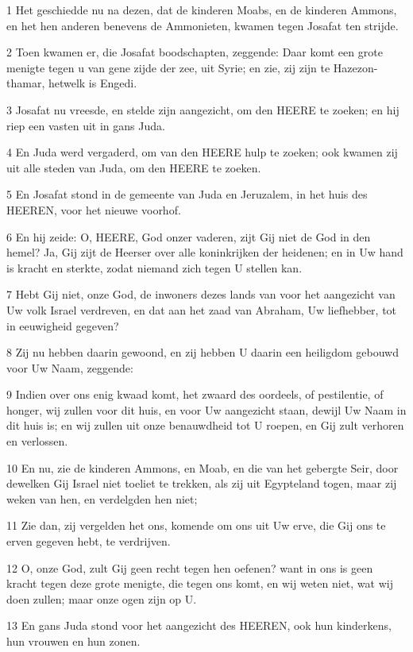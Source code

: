 \par 1 Het geschiedde nu na dezen, dat de kinderen Moabs, en de kinderen Ammons, en het hen anderen benevens de Ammonieten, kwamen tegen Josafat ten strijde.
\par 2 Toen kwamen er, die Josafat boodschapten, zeggende: Daar komt een grote menigte tegen u van gene zijde der zee, uit Syrie; en zie, zij zijn te Hazezon-thamar, hetwelk is Engedi.
\par 3 Josafat nu vreesde, en stelde zijn aangezicht, om den HEERE te zoeken; en hij riep een vasten uit in gans Juda.
\par 4 En Juda werd vergaderd, om van den HEERE hulp te zoeken; ook kwamen zij uit alle steden van Juda, om den HEERE te zoeken.
\par 5 En Josafat stond in de gemeente van Juda en Jeruzalem, in het huis des HEEREN, voor het nieuwe voorhof.
\par 6 En hij zeide: O, HEERE, God onzer vaderen, zijt Gij niet de God in den hemel? Ja, Gij zijt de Heerser over alle koninkrijken der heidenen; en in Uw hand is kracht en sterkte, zodat niemand zich tegen U stellen kan.
\par 7 Hebt Gij niet, onze God, de inwoners dezes lands van voor het aangezicht van Uw volk Israel verdreven, en dat aan het zaad van Abraham, Uw liefhebber, tot in eeuwigheid gegeven?
\par 8 Zij nu hebben daarin gewoond, en zij hebben U daarin een heiligdom gebouwd voor Uw Naam, zeggende:
\par 9 Indien over ons enig kwaad komt, het zwaard des oordeels, of pestilentie, of honger, wij zullen voor dit huis, en voor Uw aangezicht staan, dewijl Uw Naam in dit huis is; en wij zullen uit onze benauwdheid tot U roepen, en Gij zult verhoren en verlossen.
\par 10 En nu, zie de kinderen Ammons, en Moab, en die van het gebergte Seir, door dewelken Gij Israel niet toeliet te trekken, als zij uit Egypteland togen, maar zij weken van hen, en verdelgden hen niet;
\par 11 Zie dan, zij vergelden het ons, komende om ons uit Uw erve, die Gij ons te erven gegeven hebt, te verdrijven.
\par 12 O, onze God, zult Gij geen recht tegen hen oefenen? want in ons is geen kracht tegen deze grote menigte, die tegen ons komt, en wij weten niet, wat wij doen zullen; maar onze ogen zijn op U.
\par 13 En gans Juda stond voor het aangezicht des HEEREN, ook hun kinderkens, hun vrouwen en hun zonen.
